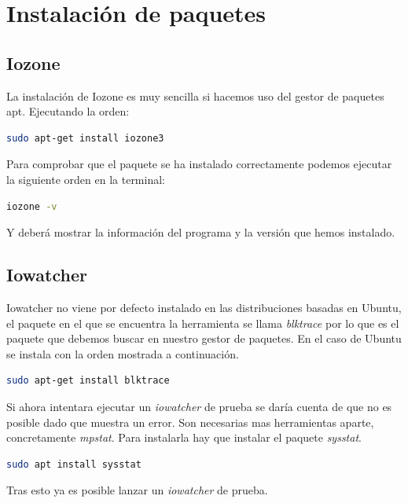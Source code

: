 \section{Instalación de paquetes}
\subsection{Iozone}
La instalación de Iozone es muy sencilla si hacemos uso del gestor de paquetes apt. Ejecutando la orden: 
\begin{lstlisting}[language=bash]
sudo apt-get install iozone3
\end{lstlisting}
Para comprobar que el paquete se ha instalado correctamente podemos ejecutar la siguiente orden en la terminal:
\begin{lstlisting}[language=bash]
iozone -v
\end{lstlisting}
Y deberá mostrar la información del programa y la versión que hemos instalado.

\subsection{Iowatcher}
Iowatcher no viene por defecto instalado en las distribuciones basadas en Ubuntu, el paquete en el que se encuentra la herramienta se llama \textit{blktrace} por lo que es el paquete que debemos buscar en nuestro gestor de paquetes. En el caso de Ubuntu se instala con la orden mostrada a continuación.
\begin{lstlisting}[language=bash]
sudo apt-get install blktrace
\end{lstlisting}
Si ahora intentara ejecutar un \textit{iowatcher} de prueba se daría cuenta de que no es posible dado que muestra un error. Son necesarias mas herramientas aparte, concretamente \textit{mpstat}. Para instalarla hay que instalar el paquete \textit{sysstat}.
\begin{lstlisting}[language=bash]
sudo apt install sysstat
\end{lstlisting}
Tras esto ya es posible lanzar un \textit{iowatcher} de prueba.

